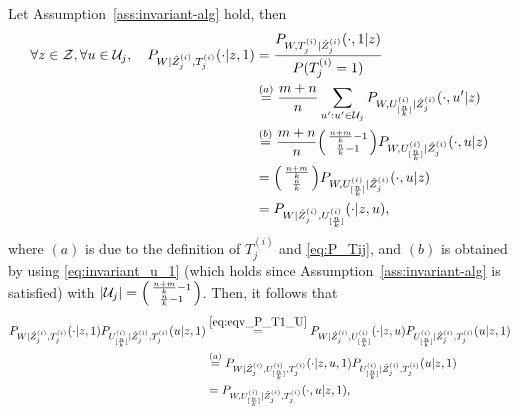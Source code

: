 \documentclass[onecolumn,romanappendices,10pt]{IEEEtran}
\newcommand{\Ucal}{{\mathcal U}}
\newcommand{\Zcal}{{\mathcal Z}}
\begin{document}
	Let Assumption~\ref{ass:invariant-alg} hold, then
	\begin{equation}
		\begin{aligned}
			\forall z \in \Zcal, \forall u \in \Ucal_j, \quad P_{W | \hat{Z}^{(i)}_j, T^{(i)}_j}(\cdot | z, 1) &= \frac{P_{W, T^{(i)}_j | \hat{Z}^{(i)}_j}(\cdot, 1 | z)}{P(T^{(i)}_j = 1)} \\
			&\overset{(a)}{=} \frac{m+n}{n} \sum_{u': u' \in \Ucal_j} P_{W, U^{(i)}_{[\frac{n}{k}]} | \hat{Z}^{(i)}_j}(\cdot, u' | z) \\
			&\overset{(b)}{=} \frac{m+n}{n} \begin{psmallmatrix} \frac{n+m}{k}-1 \\ \frac{n}{k}-1 \end{psmallmatrix} P_{W, U^{(i)}_{[\frac{n}{k}]} | \hat{Z}^{(i)}_j}(\cdot, u | z) \\
			&= \begin{psmallmatrix} \frac{n+m}{k} \\ \frac{n}{k} \end{psmallmatrix} P_{W, U^{(i)}_{[\frac{n}{k}]} | \hat{Z}^{(i)}_j}(\cdot, u | z) \\
			&= P_{W | \hat{Z}^{(i)}_j, U^{(i)}_{[\frac{n}{k}]}}(\cdot | z, u),
		\end{aligned}\label{eq:eqv_P_T1_U}
	\end{equation}
	where $(a)$ is due to the definition of $T^{(i)}_j$ and \eqref{eq:P_Tij}, and $(b)$ is obtained by using \eqref{eq:invariant_u_1} (which holds since Assumption~\ref{ass:invariant-alg} is satisfied) with $|\Ucal_j| = \begin{psmallmatrix} \frac{n+m}{k}-1 \\ \frac{n}{k}-1 \end{psmallmatrix}$. Then, it follows that
	\begin{equation}
		\begin{aligned}
			P_{W | \hat{Z}^{(i)}_j, T^{(i)}_j}(\cdot | z, 1) P_{U^{(i)}_{[\frac{n}{k}]} | \hat{Z}^{(i)}_j, T^{(i)}_j} (u | z, 1) &\overset{\eqref{eq:eqv_P_T1_U}}{=} P_{W | \hat{Z}^{(i)}_j, U^{(i)}_{[\frac{n}{k}]}} (\cdot | z, u) P_{U^{(i)}_{[\frac{n}{k}]} | \hat{Z}^{(i)}_j, T^{(i)}_j} (u | z, 1) \\
			&\overset{(a)}{=} P_{W | \hat{Z}^{(i)}_j, U^{(i)}_{[\frac{n}{k}]}, T^{(i)}_j} (\cdot | z, u, 1) P_{U^{(i)}_{[\frac{n}{k}]} | \hat{Z}^{(i)}_j, T^{(i)}_j} (u | z, 1) \\
			&= P_{W, U^{(i)}_{[\frac{n}{k}]} | \hat{Z}^{(i)}_j, T^{(i)}_j} (\cdot, u | z, 1),
		\end{aligned}\label{eq:decp_T1}
	\end{equation}
\end{document}
